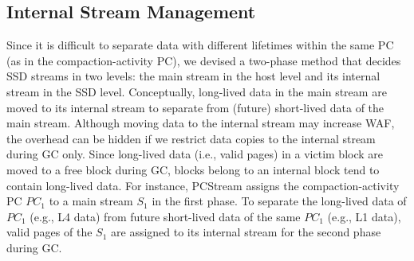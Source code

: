 \subsection{Internal Stream Management}
{\color{blue}
Since it is difficult to separate data with different lifetimes within the same PC 
(as in the compaction-activity PC), we devised a two-phase method that decides SSD 
streams in two levels: the main stream in the host level and 
its internal stream in the SSD level.
Conceptually, long-lived data in the main stream are moved to its internal stream to 
separate from (future) short-lived data of the main stream.
Although moving data to the internal stream may increase WAF,
the overhead can be hidden if we restrict data copies to the internal stream during GC only.
Since long-lived data (i.e., valid pages) in a victim block are moved to a free block during GC, 
blocks belong to an internal block tend to contain long-lived data.
For instance, \textsf{\small PCStream} assigns the compaction-activity PC {\it $PC_1$} to a
main stream {\it $S_1$} in the first phase.
To separate the long-lived data of {\it $PC_1$} (e.g., L4 data) 
from future short-lived data of the same {\it $PC_1$} (e.g., L1 data), 
valid pages of the {\it $S_1$} are assigned to its internal stream for the second phase during GC.
}



